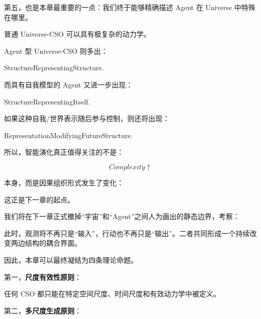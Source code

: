第五，也是本章最重要的一点：我们终于能够精确描述 Agent 在 Universe 中特殊在哪里。

普通 Universe-CSO 可以具有极复杂的动力学。

Agent 型 Universe-CSO 则多出：

\begin{statementbox}
StructureRepresentingStructure.
\end{statementbox}

而具有自我模型的 Agent 又进一步出现：

\begin{statementbox}
StructureRepresentingItself.
\end{statementbox}

如果这种自我/世界表示随后参与控制，则还将出现：

\begin{statementbox}
RepresentationModifyingFutureStructure.
\end{statementbox}

所以，智能演化真正值得关注的不是：

\[
Complexity\uparrow
\]

本身，而是因果组织形式发生了变化：

\begin{statementbox}
\centering
{}
\end{statementbox}

这正是下一章的起点。

我们将在下一章正式撤掉“宇宙”和“Agent”之间人为画出的静态边界，考察：

\begin{statementbox}
\centering
{}
\end{statementbox}

此时，观测将不再只是“输入”，行动也不再只是“输出”。二者共同形成一个持续改变两边结构的耦合界面。

因此，本章可以最终凝结为四条理论命题。

第一，\textbf{尺度有效性原则}：

\begin{proposition*}
任何 CSO 都只能在特定空间尺度、时间尺度和有效动力学中被定义。
\end{proposition*}

第二，\textbf{多尺度生成原则}：

